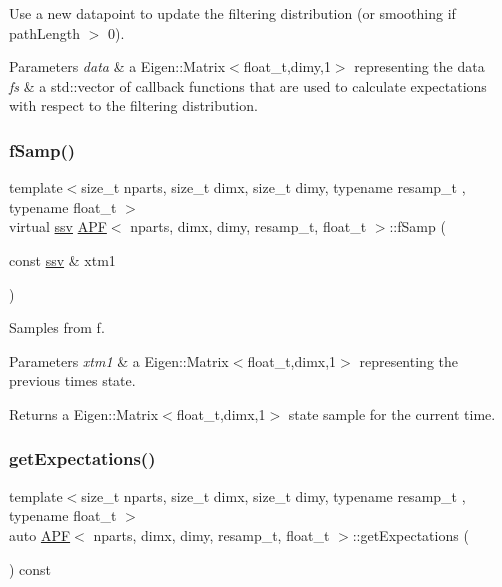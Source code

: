 Use a new datapoint to update the filtering distribution (or smoothing if path\+Length $>$ 0). 


\begin{DoxyParams}{Parameters}
{\em data} & a Eigen\+::\+Matrix$<$float\+\_\+t,dimy,1$>$ representing the data \\
\hline
{\em fs} & a std\+::vector of callback functions that are used to calculate expectations with respect to the filtering distribution. \\
\hline
\end{DoxyParams}
\mbox{\label{classAPF_a30fc3aa6c6217bd4a40f07ee5a9d60d2}} 
\subsubsection{\texorpdfstring{f\+Samp()}{fSamp()}}
{\footnotesize\ttfamily template$<$size\+\_\+t nparts, size\+\_\+t dimx, size\+\_\+t dimy, typename resamp\+\_\+t , typename float\+\_\+t $>$ \\
virtual \hyperlink{classAPF_a5f96da87f00ff75af1232f9021daf06a}{ssv} \hyperlink{classAPF}{A\+PF}$<$ nparts, dimx, dimy, resamp\+\_\+t, float\+\_\+t $>$\+::f\+Samp (\begin{DoxyParamCaption}\item[{const \hyperlink{classAPF_a5f96da87f00ff75af1232f9021daf06a}{ssv} \&}]{xtm1 }\end{DoxyParamCaption})\hspace{0.3cm}{\ttfamily [pure virtual]}}



Samples from f. 


\begin{DoxyParams}{Parameters}
{\em xtm1} & a Eigen\+::\+Matrix$<$float\+\_\+t,dimx,1$>$ representing the previous time\textquotesingle{}s state. \\
\hline
\end{DoxyParams}
\begin{DoxyReturn}{Returns}
a Eigen\+::\+Matrix$<$float\+\_\+t,dimx,1$>$ state sample for the current time. 
\end{DoxyReturn}
\mbox{\label{classAPF_a5185ce1aa918dcf176bd0a3ecf6b03dd}} 
\subsubsection{\texorpdfstring{get\+Expectations()}{getExpectations()}}
{\footnotesize\ttfamily template$<$size\+\_\+t nparts, size\+\_\+t dimx, size\+\_\+t dimy, typename resamp\+\_\+t , typename float\+\_\+t $>$ \\
auto \hyperlink{classAPF}{A\+PF}$<$ nparts, dimx, dimy, resamp\+\_\+t, float\+\_\+t $>$\+::get\+Expectations (\begin{DoxyParamCaption}{ }\end{DoxyParamCaption}) const}



